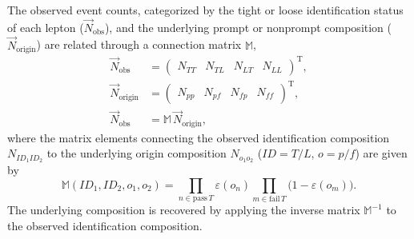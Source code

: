 The observed event counts, categorized by the tight or loose identification status of each lepton ($\vec{N}_{\text{obs}}$), and the underlying prompt or nonprompt composition ($\vec{N}_{\text{origin}}$) are related through a connection matrix $\mathbb{M}$,
\begin{align}
  \vec{N}_{\text{obs}}    &= \left( \begin{array}{cccc}N_{TT} & N_{TL} & N_{LT} & N_{LL}\end{array} \right)^{\mathrm{T}}, \nonumber \\
  \vec{N}_{\text{origin}} &= \left( \begin{array}{cccc}N_{pp} & N_{pf} & N_{fp} & N_{ff}\end{array} \right)^{\mathrm{T}}, \nonumber \\
  \vec{N}_{\text{obs}}    &= \mathbb{M}\,\vec{N}_{\text{origin}},
  \label{eq:matrix_method}
\end{align}
where the matrix elements connecting the observed identification composition $N_{ID_{1}ID_{2}}$ to the underlying origin composition $N_{o_{1}o_{2}}$ ($ID = T/L$, $o = p/f$) are given by
\begin{equation}
  \mathbb{M}(ID_{1},ID_{2},o_{1},o_{2}) = \prod_{n\in\text{pass}\,T}\varepsilon(o_{n})\prod_{m\in\text{fail}\,T}\bigl(1-\varepsilon(o_{m})\bigr).
  \label{eq:connection_matrix}
\end{equation}
The underlying composition is recovered by applying the inverse matrix $\mathbb{M}^{-1}$ to the observed identification composition.

